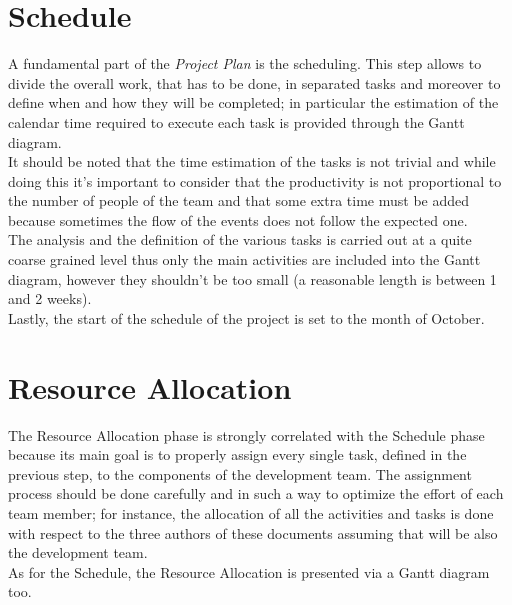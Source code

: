 \documentclass[11pt,a4paper]{report}
\begin{document}
\chapter{Schedule}
A fundamental part of the \textit{Project Plan} is the scheduling. This step allows to divide the overall work, that has to be done, in separated tasks and moreover to define when and how they will be completed; in particular the estimation of the calendar time required to execute each task is provided through the Gantt diagram.\\
It should be noted that the time estimation of the tasks is not trivial and while doing this it's important to consider that the productivity is not proportional to the number of people of the team and that some extra time must be added because sometimes the flow of the events does not follow the expected one.\\
The analysis and the definition of the various tasks is carried out at a quite coarse grained level thus only the main activities are included into the Gantt diagram, however they shouldn't be too small (a reasonable length is between 1 and 2 weeks).\\
Lastly, the start of the schedule of the project is set to the month of October.\\
\chapter{Resource Allocation}
The Resource Allocation phase is strongly correlated with the Schedule phase because its main goal is to properly assign every single task, defined in the previous step, to the components of the development team.
The assignment process should be done carefully and in such a way to optimize the effort of each team member; for instance, the allocation of all the activities and tasks is done with respect to the three authors of these documents assuming that will be also the development team.\\
As for the Schedule, the Resource Allocation is presented via a Gantt diagram too.\\
\end{document}
